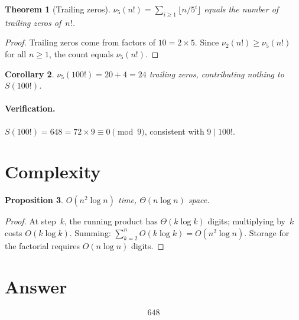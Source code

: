 \documentclass[12pt,a4paper]{article}
\newtheorem{theorem}{Theorem}
\newtheorem{proposition}[theorem]{Proposition}
\newtheorem{corollary}[theorem]{Corollary}
\theoremstyle{definition}
\begin{document}
\begin{theorem}[Trailing zeros]
$\nu_5(n!) = \sum_{i \ge 1} \lfloor n/5^i \rfloor$ equals the number of trailing zeros of~$n!$.
\end{theorem}

\begin{proof}
Trailing zeros come from factors of $10 = 2 \times 5$. Since $\nu_2(n!) \ge \nu_5(n!)$
for all $n \ge 1$, the count equals $\nu_5(n!)$.
\end{proof}

\begin{corollary}
$\nu_5(100!) = 20 + 4 = 24$ trailing zeros, contributing nothing to $S(100!)$.
\end{corollary}

\paragraph{Verification.}
$S(100!) = 648 = 72 \times 9 \equiv 0 \pmod{9}$, consistent with $9 \mid 100!$.

\section{Complexity}

\begin{proposition}
$O(n^2 \log n)$ time, $\Theta(n \log n)$ space.
\end{proposition}

\begin{proof}
At step~$k$, the running product has $\Theta(k \log k)$ digits; multiplying by~$k$ costs
$O(k \log k)$. Summing: $\sum_{k=2}^{n} O(k \log k) = O(n^2 \log n)$.
Storage for the factorial requires $O(n \log n)$ digits.
\end{proof}

\section{Answer}

\[
\boxed{648}
\]
\end{document}

